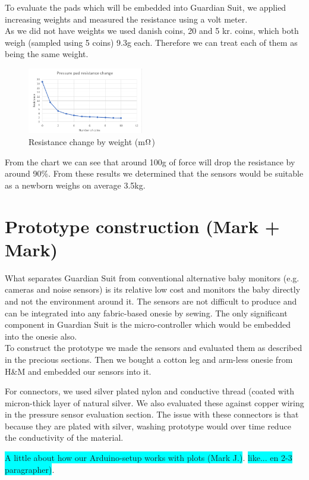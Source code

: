 \documentclass{sigchi-ext}
\begin{document}
To evaluate the pads which will be embedded into Guardian Suit, we applied 
increasing weights and measured the resistance using a volt meter.\\
As we did not have weights we used danish coins, 20 and 5 kr. coins, which both
weigh (sampled using 5 coins) 9.3g each. Therefore we can treat each of them as
being the same weight.
\begin{figure} [H]
   \centering \includegraphics[width=0.45\textwidth]{img/chart.PNG}
    \caption{Resistance change by weight (m$\ohm$)}
\end{figure}
From the chart we can see that around 100g of force will drop the resistance
by around 90\%. From these results we determined that the sensors would be suitable
as a newborn weighs on average 3.5kg.

\clearpage

\section{Prototype construction (Mark + Mark)}
What separates Guardian Suit from conventional alternative baby monitors 
(e.g. cameras and noise sensors) is its relative low cost and monitors the
baby directly and not the environment around it. The 
sensors are not difficult to produce and can be integrated into any fabric-based
onesie by sewing. The only significant component in Guardian Suit is the
micro-controller which would be embedded into the onesie also.\\
To construct the prototype we made the sensors and evaluated them as
described in the precious sections. Then we bought a cotton leg and arm-less
onesie from H\&M and embedded our sensors into it.

For connectors, we used silver plated nylon and conductive thread (coated with
micron-thick layer of natural silver. We also evaluated these against copper
wiring in the pressure sensor evaluation section. The issue with these
connectors is that because they are plated with silver, washing prototype
would over time reduce the conductivity of the material.

\colorbox{cyan}{A little about how our Arduino-setup works with plots (Mark J.)}.
\colorbox{cyan}{like... en 2-3 paragrapher)}.
\end{document}
